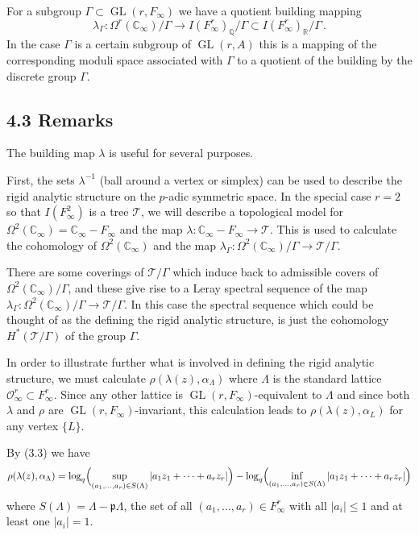 \documentclass[12pt,a4paper]{article}
\theoremstyle{plain}
\theoremstyle{definition}
\theoremstyle{remark}
\DeclareMathOperator{\GL}{GL}
\begin{document}
For a subgroup $\Gamma \subset \GL(r, F_\infty)$ we have a quotient building 
mapping
\[
\lambda_\Gamma\colon \Omega^r(\mathbb{C}_\infty)/\Gamma \longrightarrow I(F_\infty^r)_\mathbb{Q}/\Gamma \subset I(F_\infty^r)_\mathbb{R}/\Gamma \,.
\]
In the case $\Gamma$ is a certain subgroup of $\GL(r,A)$ this is a mapping 
of the corresponding moduli space associated with $\Gamma$ to a quotient of 
the building by the discrete group $\Gamma$.

\subsection*{4.3 Remarks}

The building map $\lambda$ is useful for several purposes.

First, the sets $\lambda^{-1}$ (ball around a vertex or simplex) can be used 
to describe the rigid analytic structure on the $p$-adic symmetric space. In 
the special case $r = 2$ so that $I(F_\infty^2)$ is a tree $\mathcal{T}$, we 
will describe a topological model for $\Omega^2(\mathbb{C}_\infty) = \mathbb{C}_\infty - F_\infty$ 
and the map $\lambda\colon \mathbb{C}_\infty - F_\infty \to \mathcal{T}$. This is used 
to calculate the cohomology of $\Omega^2(\mathbb{C}_\infty)$ and the map 
$\lambda_\Gamma\colon \Omega^2(\mathbb{C}_\infty)/\Gamma \to \mathcal{T}/\Gamma$.

There are some coverings of $\mathcal{T}/\Gamma$ which induce back to 
admissible covers of $\Omega^2(\mathbb{C}_\infty)/\Gamma$, and these give rise to 
a Leray spectral sequence of the map 
$\lambda_\Gamma\colon \Omega^2(\mathbb{C}_\infty)/\Gamma \to \mathcal{T}/\Gamma$. In 
this case the spectral sequence which could be thought of as the defining 
the rigid analytic structure, is just the cohomology $H^*(\mathcal{T}/\Gamma)$ 
of the group $\Gamma$.

In order to illustrate further what is involved in defining the rigid 
analytic structure, we must calculate $\rho(\lambda(z), \alpha_\Lambda)$ where 
$\Lambda$ is the standard lattice $\mathcal{O}_\infty^r \subset F_\infty^r$. 
Since any other lattice is $\GL(r, F_\infty)$-equivalent to $\Lambda$ and 
since both $\lambda$ and $\rho$ are $\GL(r, F_\infty)$-invariant, this 
calculation leads to $\rho(\lambda(z), \alpha_L)$ for any vertex 
$\{L\}$.

By (3.3) we have
\[
\rho(\lambda(z), \alpha_\Lambda) = \log_q\Bigl(\sup_{(a_1,\ldots,a_r) \in S(\Lambda)} |a_1 z_1 + \cdots + a_r z_r|\Bigr) - \log_q\Bigl(\inf_{(a_1,\ldots,a_r) \in S(\Lambda)} |a_1 z_1 + \cdots + a_r z_r|\Bigr)
\]
where $S(\Lambda) = \Lambda - \mathfrak{p}\Lambda$, the set of all 
$(a_1, \ldots, a_r) \in F_\infty^r$ with all $|a_i| \leqslant 1$ and at least 
one $|a_i| = 1$.
\end{document}

